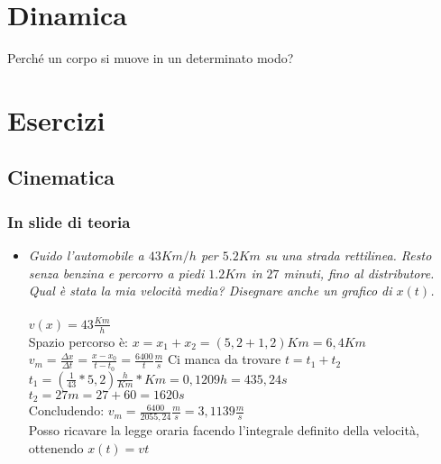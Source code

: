 \documentclass[a4paper,12pt]{report}
\begin{document}
	\chapter{Dinamica}
	Perché un corpo si muove in un determinato modo?
	\appendix
	\chapter{Esercizi}
	\section{Cinematica}
	\subsection{In slide di teoria}
	\begin{itemize}
		\item \textit{Guido l’automobile a $43 Km/h$ per $5.2 Km$ su una strada rettilinea. Resto senza benzina e 
			percorro a piedi $1.2 Km$ in $27$ minuti, fino al distributore. Qual è stata la mia velocità media? 
			Disegnare anche un grafico di $x(t)$.}\\\\
			$v(x) = 43 \frac{Km}{h}$\\
			Spazio percorso è: $x = x_1 + x_2 = (5,2 + 1,2)Km = 6,4Km$\\
			$v_m = \frac{\Delta x}{\Delta t} = \frac{x- x_0}{t - t_0} = \frac{6400}{t}\frac{m}{s}$ Ci manca da trovare $t = t_1 + t_2$\\
			$t_1 = (\frac{1}{43} * 5,2)\frac{h}{Km} * Km = 0,1209h = 435,24s$\\
			$t_2 = 27m = 27 + 60 = 1620s$\\
			Concludendo: $v_m = \frac{6400}{2055,24}\frac{m}{s} = 3,1139\frac{m}{s}$\\
			Posso ricavare la legge oraria facendo l'integrale definito della velocità, ottenendo $x(t) = vt$
	\end{itemize}
	
\end{document}

